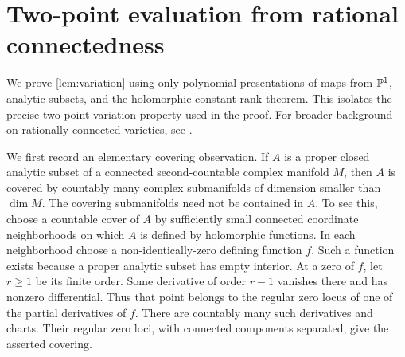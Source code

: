 \section{Two-point evaluation from rational connectedness}
\label{app:variation}

We prove \cref{lem:variation} using only polynomial presentations
of maps from \(\mathbb P^1\), analytic subsets, and the holomorphic
constant-rank theorem. This isolates the precise two-point variation
property used in the proof. For broader background on rationally
connected varieties, see \cite{KMM92,Kol99}.

We first record an elementary covering observation.
If \(A\) is a proper closed analytic subset of a connected
second-countable complex manifold \(M\), then \(A\) is covered
by countably many complex submanifolds of dimension smaller
than \(\dim M\). The covering submanifolds need not be contained
in \(A\).
To see this, choose a countable cover of \(A\) by sufficiently small connected
coordinate neighborhoods on which \(A\) is defined by holomorphic
functions. In each neighborhood choose a non-identically-zero defining
function \(f\). Such a function exists because a proper analytic subset
has empty interior.
At a zero of \(f\), let \(r\ge1\) be its finite order.
Some derivative of order \(r-1\) vanishes there and has
nonzero differential. Thus that point belongs to the regular
zero locus of one of the partial derivatives of \(f\).
There are countably many such derivatives and charts.
Their regular zero loci, with connected components separated,
give the asserted covering.

